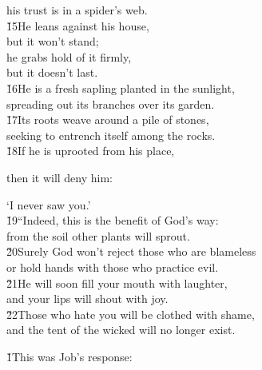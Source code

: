 \begin{poetry}
\poemll    his trust is in a spider's web. \\
\poeml \v{15}He leans against his house, \\
\poemll    but it won't stand; \\
\poeml he grabs hold of it firmly, \\
\poemll    but it doesn't last. \\
\poeml \v{16}He is a fresh sapling planted in the sunlight, \\
\poemll    spreading out its branches over its garden. \\
\poeml \v{17}Its roots weave around a pile of stones, \\
\poemll    seeking to entrench itself among the rocks. \\
\poeml \v{18}If he is uprooted from his place,
\end{poetry}

then it will deny him:

\begin{poetry}
\poemlll       `I never saw you.' \\
\poeml \v{19}``Indeed, this is the benefit of God's way: \\
\poemll    from the soil other plants will sprout. \\
\poeml \v{20}Surely God won't reject those who are blameless \\
\poemll    or hold hands with those who practice evil. \\
\poeml \v{21}He will soon fill your mouth with laughter, \\
\poemll    and your lips will shout with joy. \\
\poeml \v{22}Those who hate you will be clothed with shame, \\
\poemll    and the tent of the wicked will no longer exist.
\end{poetry}

\v{1}This was Job's response:

